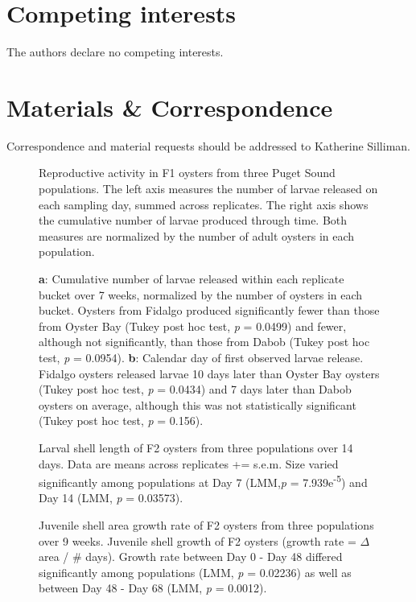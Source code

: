 \documentclass[fleqn,10pt]{wlscirep}
\begin{document}
\section*{Competing interests}
The authors declare no competing interests.

\section*{Materials \& Correspondence}
Correspondence and material requests should be addressed to Katherine Silliman.

\begin{figure}[H]
\caption{Reproductive activity in F1 oysters from three Puget Sound populations. The left axis measures the number of larvae released on each sampling day, summed across replicates. The right axis shows the cumulative number of larvae produced through time. Both measures are normalized by the number of adult oysters in each population.}
\label{fig:Figure 1}
\end{figure}

\begin{figure}[H]
\caption{\textbf{a}: Cumulative number of larvae released within each replicate bucket over 7 weeks, normalized by the number of oysters in each bucket. Oysters from Fidalgo produced significantly fewer than those from Oyster Bay (Tukey post hoc test, \textit{p} = 0.0499) and fewer, although not significantly, than those from Dabob (Tukey post hoc test, \textit{p} = 0.0954). \textbf{b}: Calendar day of first observed larvae release. Fidalgo oysters released larvae 10 days later than Oyster Bay oysters (Tukey post hoc test, \textit{p} = 0.0434) and 7 days later than Dabob oysters on average, although this was not statistically significant (Tukey post hoc test, \textit{p} = 0.156).}
\label{fig:Figure 2}
\end{figure}

\begin{figure}[H]
\caption{Larval shell length of F2 oysters from three populations over 14 days. Data are means across replicates += s.e.m. Size varied significantly among populations at Day 7 (LMM,\textit{p} = 7.939e\textsuperscript{-5}) and Day 14 (LMM, \textit{p} = 0.03573).}
\label{fig:Figure 3}
\end{figure}

\begin{figure}[H]
\caption{Juvenile shell area growth rate of F2 oysters from three populations over 9 weeks. Juvenile shell growth of F2 oysters (growth rate = $\Delta$area / \# days). Growth rate between Day 0 - Day 48 differed significantly among populations (LMM, \textit{p} = 0.02236) as well as between Day 48 - Day 68 (LMM, \textit{p} = 0.0012).}
\label{fig:Figure 4}
\end{figure}
\end{document}
